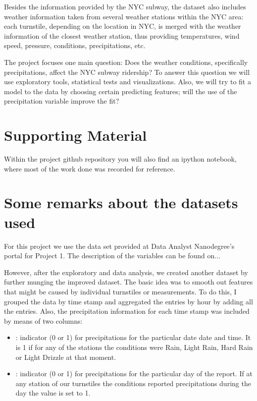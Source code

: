 \documentclass[letterpaper,10pt,english]{sphinxmanual}
\begin{document}
Besides the information provided by the NYC subway, the dataset also includes
weather information taken from several weather stations within the NYC area:
each turnstile, depending on the location in NYC, is merged with the weather
information of the closest weather station, thus providing temperatures, wind
speed, pressure, conditions, precipitations, etc.

The project focuses one main question: Does the weather conditions, specifically
precipitations, affect the NYC subway ridership? To answer this question we
will use exploratory tools, statistical tests and visualizations. Also, we will
try to fit a model to the data by choosing certain predicting features; will
the use of the precipitation variable improve the fit?


\section{Supporting Material}
\label{overview:supporting-material}
Within the project github repository you will also find an ipython notebook,
where most of the work done was recorded for reference.


\section{Some remarks about the datasets used}
\label{overview:some-remarks-about-the-datasets-used}
For this project we use the data set provided at Data Analyst Nanodegree's
portal for Project 1. The description of the variables can be found on...

However, after the exploratory and data analysis, we created another dataset by
further munging the improved dataset. The basic idea was to smooth out features that
might be caused by individual turnstiles or measurements. To do this, I
grouped the data by time stamp and aggregated the entries by hour by adding all
the entries. Also, the precipitation information for each
time stamp was included by means of two columns:
\begin{itemize}
\item {} 
: indicator (0 or 1) for precipitations for the particular date
date and time. It is 1 if for any of the stations the conditions were Rain,
Light Rain, Hard Rain or Light Drizzle at that moment.

\item {} 
: indicator (0 or 1) for precipitations for the particular day
of the report. If at any station of our turnstiles the conditions reported
precipitations during the day the value is set to 1.

\end{itemize}
\end{document}
